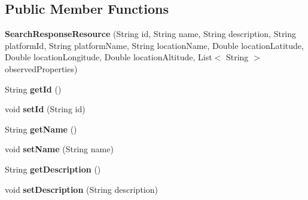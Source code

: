 \subsection*{Public Member Functions}
\begin{DoxyCompactItemize}
\item 
{\bfseries Search\+Response\+Resource} (String id, String name, String description, String platform\+Id, String platform\+Name, String location\+Name, Double location\+Latitude, Double location\+Longitude, Double location\+Altitude, List$<$ String $>$ observed\+Properties)\hypertarget{classeu_1_1h2020_1_1symbiote_1_1query_1_1SearchResponseResource_a2cea8e2054c2d25a53c13153293c33d3}{}\label{classeu_1_1h2020_1_1symbiote_1_1query_1_1SearchResponseResource_a2cea8e2054c2d25a53c13153293c33d3}

\item 
String {\bfseries get\+Id} ()\hypertarget{classeu_1_1h2020_1_1symbiote_1_1query_1_1SearchResponseResource_adeb1a735b00bd99d3cf63bfa036ed851}{}\label{classeu_1_1h2020_1_1symbiote_1_1query_1_1SearchResponseResource_adeb1a735b00bd99d3cf63bfa036ed851}

\item 
void {\bfseries set\+Id} (String id)\hypertarget{classeu_1_1h2020_1_1symbiote_1_1query_1_1SearchResponseResource_af35030bd4c6033f4d05846b938a82b4b}{}\label{classeu_1_1h2020_1_1symbiote_1_1query_1_1SearchResponseResource_af35030bd4c6033f4d05846b938a82b4b}

\item 
String {\bfseries get\+Name} ()\hypertarget{classeu_1_1h2020_1_1symbiote_1_1query_1_1SearchResponseResource_a4d31fc065b27d8c018af7932167c2e96}{}\label{classeu_1_1h2020_1_1symbiote_1_1query_1_1SearchResponseResource_a4d31fc065b27d8c018af7932167c2e96}

\item 
void {\bfseries set\+Name} (String name)\hypertarget{classeu_1_1h2020_1_1symbiote_1_1query_1_1SearchResponseResource_a3870b790e9ec8a07dfb6e39ba609877b}{}\label{classeu_1_1h2020_1_1symbiote_1_1query_1_1SearchResponseResource_a3870b790e9ec8a07dfb6e39ba609877b}

\item 
String {\bfseries get\+Description} ()\hypertarget{classeu_1_1h2020_1_1symbiote_1_1query_1_1SearchResponseResource_a9a816ae05b21202629e9ee4101bae66c}{}\label{classeu_1_1h2020_1_1symbiote_1_1query_1_1SearchResponseResource_a9a816ae05b21202629e9ee4101bae66c}

\item 
void {\bfseries set\+Description} (String description)\hypertarget{classeu_1_1h2020_1_1symbiote_1_1query_1_1SearchResponseResource_a8e8e92d882aa8d6ec21092c88ab0f2e9}{}\label{classeu_1_1h2020_1_1symbiote_1_1query_1_1SearchResponseResource_a8e8e92d882aa8d6ec21092c88ab0f2e9}


\end{DoxyCompactItemize}
